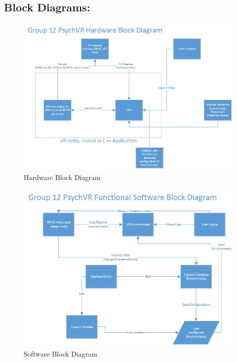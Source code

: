 \documentclass[a4paper,10pt]{article}
\begin{document}
	\subsection{Block Diagrams:}
	\begin{figure}[ht!]
	\includegraphics[width=\linewidth,height=\paperheight,keepaspectratio]{HardwareConfig.png}
	\caption{Hardware Block Diagram}
	\label{fig:hblock}
	\end{figure}
	\begin{figure}[ht!]
	\includegraphics[width=\linewidth,height=\paperheight,keepaspectratio]{SoftwareConfig.png}
	\caption{Software Block Diagram}
	\label{fig:sblock}
	\end{figure}
	\pagebreak
	
\end{document}

